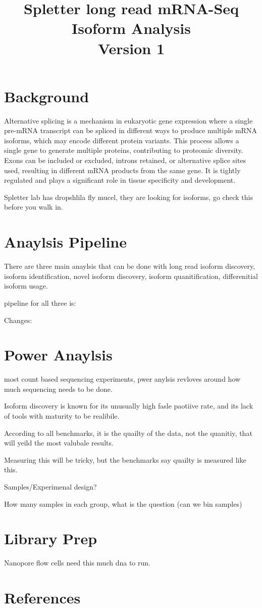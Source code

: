 \documentclass[12pt]{article}
\title{Spletter long read mRNA-Seq Isoform Analysis \\ \large Version 1}
\author{}
\date{\vspace{-2cm}}
\begin{document}
\maketitle

\setlength{\parindent}{2em} 
\section{Background}
Alternative splicing is a mechanism in eukaryotic gene expression where a single pre-mRNA transcript can be spliced in different ways to produce multiple mRNA isoforms, which may encode different protein variants. This process allows a single gene to generate multiple proteins, contributing to proteomic diversity. Exons can be included or excluded, introns retained, or alternative splice sites used, resulting in different mRNA products from the same gene. It is tightly regulated and plays a significant role in tissue specificity and development.

Spletter lab has dropshlila fly mucel, they are looking for isoforms, go check this before you walk in.
\section{Anaylsis Pipeline}

There are three main anaylsis that can be done with long read isoform discovery, isoform identification, novel isoform discovery, isoform quanitification, differenitial isoform usage.



pipeline for all three is:

Changes: 


\section{Power Anaylsis}

most count based sequencing experiments, pwer anylsis revloves around how much sequencing needs to be done.

Isoform discovery is known for its unusually high fasle paotiive rate, and its lack of tools with maturity to be realibile.

According to all benchmarks, it is the quailty of the data, not the quanitiy, that will yeild the most valubale results.

Measuring this will be tricky, but the benchmarks say quailty is measured like this.

Samples/Experimenal design?

How many samples in each group, what is the question (can we bin samples)





\section{Library Prep}

Nanopore flow cells need this much dna to run. 


\section{References}
\end{document}

